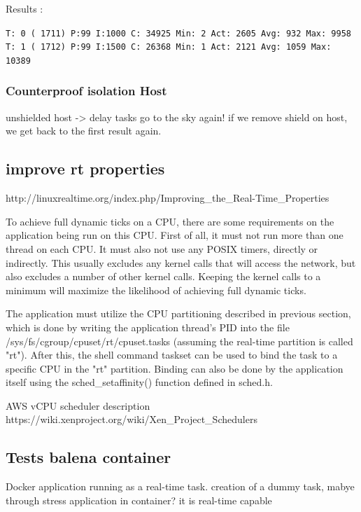 \documentclass[]{scrartcl}
\begin{document}
\noindent Results :

\noindent  
\texttt{T: 0 ( 1711) P:99 I:1000 C:  34925 Min:      2 Act: 2605 Avg:  932 Max:    9958}
\noindent
\texttt{T: 1 ( 1712) P:99 I:1500 C:  26368 Min:      1 Act: 2121 Avg: 1059 Max:   10389}


\subsubsection{Counterproof isolation Host}

unshielded host -> delay tasks go to the sky again!
if we remove shield on host, we get back to the first result again.

\subsection{improve rt properties}

http://linuxrealtime.org/index.php/Improving_the_Real-Time_Properties



To achieve full dynamic ticks on a CPU, there are some requirements on the application being run on this CPU. First of all, it must not run more than one thread on each CPU. It must also not use any POSIX timers, directly or indirectly. This usually excludes any kernel calls that will access the network, but also excludes a number of other kernel calls. Keeping the kernel calls to a minimum will maximize the likelihood of achieving full dynamic ticks.

The application must utilize the CPU partitioning described in previous section, which is done by writing the application thread's PID into the file /sys/fs/cgroup/cpuset/rt/cpuset.tasks (assuming the real-time partition is called "rt"). After this, the shell command taskset can be used to bind the task to a specific CPU in the "rt" partition. Binding can also be done by the application itself using the sched_setaffinity() function defined in sched.h.


AWS vCPU scheduler description
https://wiki.xenproject.org/wiki/Xen_Project_Schedulers



\subsection{Tests balena container}

Docker application running as a real-time task. creation of a dummy task, mabye through stress application in container? it is real-time capable
\end{document}
